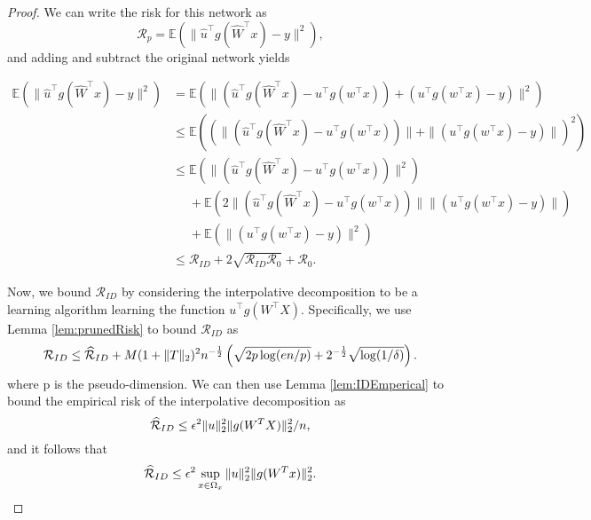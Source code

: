 \begin{proof}
We can write the risk for this network as
\begin{equation*}
    \mathcal{R}_p=\mathbb{E}(\|\widehat{u}^\top g(\widehat{W}^\top x)- y\|^2),
\end{equation*} and adding and subtract the original network yields

\begin{equation*}
\begin{aligned}
    \mathbb{E}(\|\widehat{u}^\top g(\widehat{W}^\top x)- y\|^2) &= \mathbb{E}(\|(\widehat{u}^\top g(\widehat{W}^\top x)-u^\top g (w^\top x))+(u^\top g (w^\top x)- y)\|^2)\\
    &\leq \mathbb{E}((\|(\widehat{u}^\top g(\widehat{W}^\top x)-u^\top g (w^\top x))\|+\|(u^\top g (w^\top x)- y)\|)^2)\\
   &\leq \mathbb{E}(\|(\widehat{u}^\top g(\widehat{W}^\top x)-u^\top g (w^\top x))\|^2)\\
   &\phantom{\leq}+ \mathbb{E}(2\|(\widehat{u}^\top g(\widehat{W}^\top x)-u^\top g (w^\top x))\|\|(u^\top g (w^\top x)- y)\|)\\
   &\phantom{\leq}+\mathbb{E}(\|(u^\top g (w^\top x)- y)\|^2)\\
   &\leq  \mathcal{R}_{ID} + 2  \sqrt{ \mathcal{R}_{ID}  \mathcal{R}_0}+ \mathcal{R}_0.
\end{aligned}
\end{equation*}

Now, we bound $\mathcal{R}_{ID}$ by 
considering the interpolative decomposition to be a learning algorithm learning the function $u^\top g(W^\top X)$.
Specifically, we use Lemma \ref{lem:prunedRisk} to bound $\mathcal{R}_{ID}$ as  
\begin{equation*}
    \mathcal{R}_{ID} \leq \widehat{\mathcal{R}}_{ID} + M(1+\|T\|_2)^2n^{-\frac{1}{2}}\left( \sqrt{2p\log(en/p)}+ 2^{-\frac{1}{2}}\sqrt{\log (1/\delta)}\right).
\end{equation*}
where p is the pseudo-dimension. We can then use Lemma \ref{lem:IDEmperical} to bound the empirical risk of the interpolative decomposition as  
\begin{equation*}
    \widehat{\mathcal{R}}_{ID} \leq  \epsilon^2 \|u\|_2^2 \| g(W^T X)\|_2^2 / n,
\end{equation*}
and it follows that
\begin{equation*}
    \widehat{\mathcal{R}}_{ID} \leq \epsilon^2 \sup_{x\in\Omega_x} \|u\|_2^2 \| g(W^T x)\|_2^2.
\end{equation*}

\end{proof}


